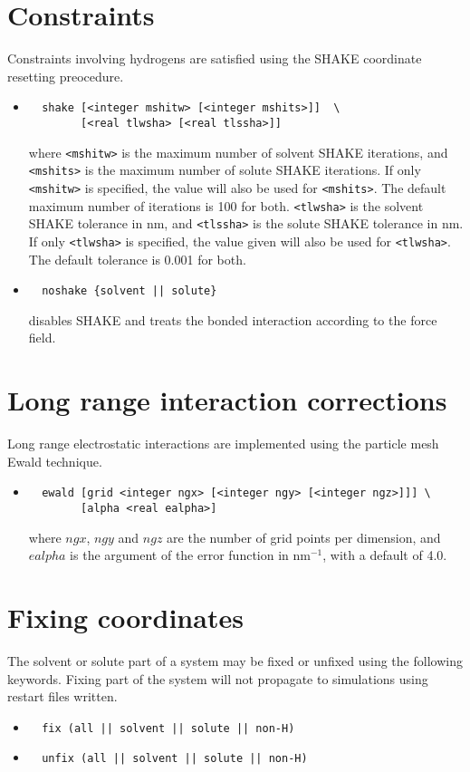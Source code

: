 \section{Constraints}
Constraints involving hydrogens are satisfied using the SHAKE 
coordinate resetting preocedure.
\begin{itemize}
\item
\begin{verbatim}
  shake [<integer mshitw> [<integer mshits>]]  \
        [<real tlwsha> [<real tlssha>]]
\end{verbatim}
where \verb+<mshitw>+ is the maximum number of solvent SHAKE iterations,
and \verb+<mshits>+ is the maximum number of solute SHAKE iterations. If
only \verb+<mshitw>+ is specified, the value will also be used for \verb+<mshits>+.
The default maximum number of iterations is 100 for both.
\verb+<tlwsha>+ is the solvent SHAKE tolerance in nm, and \verb+<tlssha>+ is
the solute SHAKE tolerance in nm. If only \verb+<tlwsha>+ is specified, the
value given will also be used for \verb+<tlwsha>+. The default tolerance
is 0.001 for both.
\item
\begin{verbatim}
  noshake {solvent || solute}
\end{verbatim}
disables SHAKE and treats the bonded interaction according to the
force field.
\end{itemize}

\section{Long range interaction corrections}
Long range electrostatic interactions are implemented using the
particle mesh Ewald technique.
\begin{itemize}
\item
\begin{verbatim}
  ewald [grid <integer ngx> [<integer ngy> [<integer ngz>]]] \
        [alpha <real ealpha>]
\end{verbatim}
where $ngx$, $ngy$ and $ngz$ are the number of grid points per
dimension, and $ealpha$ is the argument of the error function in
nm$^{-1}$, with a default of 4.0.
\end{itemize}

\section{Fixing coordinates}
The solvent or solute part of a system may be fixed or unfixed using
the following keywords. Fixing part of the system will not propagate to
simulations using restart files written.
\begin{itemize}
\item
\begin{verbatim}
  fix (all || solvent || solute || non-H)
\end{verbatim}
\item
\begin{verbatim}
  unfix (all || solvent || solute || non-H)
\end{verbatim}
\end{itemize}

